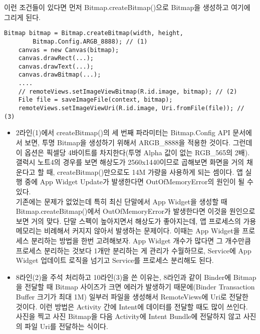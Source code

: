 이런 조건들이 있다면 먼저 Bitmap.createBitmap()으로 Bitmap을 생성하고 여기에 그리게 된다.
\begin{lstlisting}[frame=single] 
	Bitmap bitmap = Bitmap.createBitmap(width, height, 
		Bitmap.Config.ARGB_8888); // (1)
	canvas = new Canvas(bitmap);
	canvas.drawRect(...);
	canvas.drawText(...);
	canvas.drawBitmap(...);
	....
	// remoteViews.setImageViewBitmap(R.id.image, bitmap); // (2)
	File file = saveImageFile(context, bitmap);
	remoteViews.setImageViewUri(R.id.image, Uri.fromFile(file)); // (3)
\end{lstlisting}
\begin{itemize}
\item 2라인(1)에서 createBitmap()의 세 번째 파라미터는 Bitmap.Config API 문서에서 보면, 투명 Bitmap을 생성하기 위해서 ARGB\_8888을 적용한 것이다.
그런데 이 옵션은 픽셀당 4바이트를 차지한다(투명 Alpha 값이 없는 RGB\_565의 2배). 갤럭시 노트4의 경우를 보면 해상도가 2560x1440이므로 곱해보면 화면을 거의 채운다고 할 때, createBitmap()만으로도 14M 가량을 사용하게 되는 셈이다. 
앱 실행 중에 App Widget Update가 발생한다면 OutOfMemoryError의 원인이 될 수 있다.\\

기존에는 문제가 없었는데 특히 최신 단말에서 App Widget을 생성할 때 Bitmap.createBitmap()에서 OutOfMemoryError가 발생한다면 이것을 원인으로 보면 거의 맞다.
단말 스펙이 높아지면서 해상도가 좋아지는데, 앱 프로세스의 가용 메모리는 비례해서 커지지 않아서 발생하는 문제이다.
이때는 App Widget을 프로세스 분리하는 방법을 한번 고려해보자.
App Widget 개수가 많다면 그 개수만큼 프로세스 분리하는 것보다 1개만 분리하는 게 관리가 수월하므로, Service에 App Widget 업데이트 로직을 넘기고 Service를 프로세스 분리해도 된다.

\item 8라인(2)을 주석 처리하고 10라인(3)을 쓴 이유는, 8라인과 같이 Binder에 Bitmap을 전달할 때 Bitmap 사이즈가 크면 에러가 발생하기 때문에(Binder Transaction Buffer 크기가  최대 1M) 일부러 파일을 생성해서 RemoteViews에 Uri로 전달한 것이다. 
이런 방법은 Activity 간에 Intent에 데이터를 전달할 때도 많이 쓰인다. 사진을 찍고 사진 Bitmap을 다음 Activity에 Intent Bundle에 전달하지 않고 사진의 파일 Uri를 전달하는 식이다.
\end{itemize}
